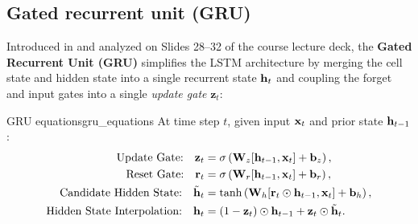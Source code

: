 \documentclass[../../main.tex]{subfiles}
\begin{document}
\subsection{Gated recurrent unit (GRU)}
Introduced in \cite{cho2014} and analyzed on Slides 28--32 of the course lecture deck, the \textbf{Gated Recurrent Unit (GRU)} simplifies the LSTM architecture by merging the cell state and hidden state into a single recurrent state $\mathbf{h}_t$ and coupling the forget and input gates into a single \emph{update gate} $\mathbf{z}_t$:

\begin{definition}{GRU equations}{gru_equations}
At time step $t$, given input $\mathbf{x}_t$ and prior state $\mathbf{h}_{t-1}$:
\begin{align}
\text{Update Gate:} \quad \mathbf{z}_t &= \sigma\left( \mathbf{W}_z [\mathbf{h}_{t-1}, \mathbf{x}_t] + \mathbf{b}_z \right), \label{eq:gru_update} \\
\text{Reset Gate:} \quad \mathbf{r}_t &= \sigma\left( \mathbf{W}_r [\mathbf{h}_{t-1}, \mathbf{x}_t] + \mathbf{b}_r \right), \label{eq:gru_reset} \\
\text{Candidate Hidden State:} \quad \tilde{\mathbf{h}}_t &= \tanh\left( \mathbf{W}_h [\mathbf{r}_t \odot \mathbf{h}_{t-1}, \mathbf{x}_t] + \mathbf{b}_h \right), \label{eq:gru_candidate} \\
\text{Hidden State Interpolation:} \quad \mathbf{h}_t &= (1 - \mathbf{z}_t) \odot \mathbf{h}_{t-1} + \mathbf{z}_t \odot \tilde{\mathbf{h}}_t. \label{eq:gru_hidden}
\end{align}
\end{definition}
\end{document}
